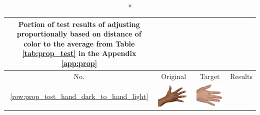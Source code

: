 \begin{longtable}{|c||c|c|c|}
    \caption*{Portion of test results of adjusting proportionally based on distance of color to the average from Table \ref{tab:prop_test} in the Appendix \ref{app:prop}}\\
    \hline
    No. & Original & Target & Results \\
    \hline  \ref{row:prop_test_hand_dark_to_hand_light} &
  \begin{minipage}{.29\textwidth}
    \includegraphics[width=\textwidth,height=\textheight,keepaspectratio]{../inputs/hand_dark.jpg}
  \end{minipage} & 
  \begin{minipage}{.29\textwidth}
    \includegraphics[width=\textwidth,height=\textheight,keepaspectratio]{../inputs/hand_light.jpg}

\end{minipage}
\end{longtable}
